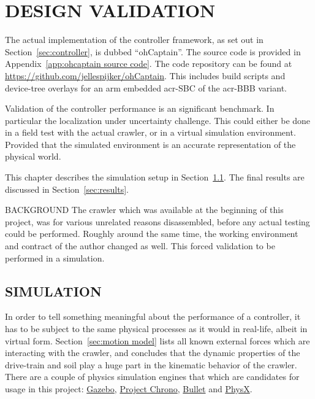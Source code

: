 

\chapter{DESIGN VALIDATION}\label{chap:design validation}

The actual implementation of the controller framework, as set out in Section~\ref{sec:controller}, is dubbed
``ohCaptain''. The source code is provided in Appendix~\ref{app:ohcaptain source code}. The code repository can be found
at \url{https://github.com/jellespijker/ohCaptain}. This includes build scripts and device-tree overlays for an arm
embedded \gls{acr-SBC} of the \gls{acr-BBB} variant.

Validation of the controller performance is an significant benchmark. In particular the localization under uncertainty
challenge. This could either be done in a field test with the actual crawler, or in a virtual simulation environment.
Provided that the simulated environment is an accurate representation of the physical world.

\noindent This chapter describes the simulation setup in Section~\ref{sec:simulation}. The final results are discussed
in Section~\ref{sec:results}.

\begin{RoyalNote}{BACKGROUND}
    The crawler which was available at the beginning of this project, was for various unrelated reasons disassembled,
    before any actual testing could be performed. Roughly around the same time, the working environment and contract 
    of the author changed as well. This forced validation to be performed in a simulation.
\end{RoyalNote}


\section{SIMULATION}\label{sec:simulation}

In order to tell something meaningful about the performance of a controller, it has to be subject to the same physical
processes as it would in real-life, albeit in virtual form. Section~\ref{sec:motion model} lists all known external
forces which are interacting with the crawler, and concludes that the dynamic properties of the drive-train and soil
play a huge part in the kinematic behavior of the crawler. There are a couple of physics simulation engines that which
are candidates for usage in this project:  \href{http://gazebosim.org/}{Gazebo},
\href{https://projectchrono.org/}{Project Chrono}, \href{https://pybullet.org/wordpress/}{Bullet} and
\href{https://developer.nvidia.com/gameworks-physx-overview}{PhysX}.

